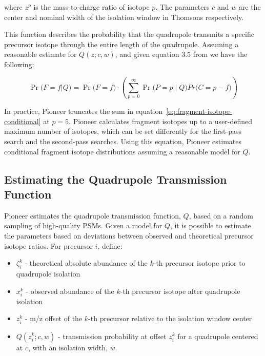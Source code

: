 \documentclass[pdflatex,sn-nature]{sn-jnl}
\begin{document}
where $z^{p}$ is the mass-to-charge ratio of isotope $p$. The parameters $c$ and $w$ are the center and nominal width of the isolation window in Thomsons respectively. 

This function describes the probability that the quadrupole transmits a specific precursor isotope through the entire length of the quadrupole. Assuming a reasonable estimate for $Q(z; c, w)$, and given equation 3.5 from \cite{Goldfarb2018-ai} we have the following: 

\begin{equation}
    \Pr\bigl( F=f | Q) =\Pr\bigl(F = f\bigr) \cdot \left(\sum\limits_{p = 0}^{\infty} \Pr\bigl( P=p \mid Q)Pr\bigl(C = p - f\bigr) \right)
\end{equation}\label{eq:fragment-isotope-conditional}

In practice, Pioneer truncates the sum in equation~\eqref{eq:fragment-isotope-conditional} at $p=5$. Pioneer calculates fragment isotopes up to a user-defined maximum number of isotopes, which can be set differently for the first-pass search and the second-pass searches. Using this equation, Pioneer estimates conditional fragment isotope distributions assuming a reasonable model for $Q$.



\subsection{Estimating the Quadrupole Transmission Function}\label{subsec:estimating-quadrupole-transmission}
Pioneer estimates the quadrupole transmission function, $Q$, based on a random sampling of high-quality PSMs. Given a model for $Q$, it is possible to estimate the parameters based on deviations between observed and theoretical precursor isotope ratios. For precursor $i$, define:

\begin{itemize}
    \item $\zeta_{i}^{k}$ - theoretical absolute abundance of the $k$-th precursor isotope prior to quadrupole isolation
    \item $x_{i}^{k}$ - observed abundance of the $k$-th precursor isotope after quadrupole isolation
    \item $z_{i}^{k}$ - m/z offset of the $k$-th precursor relative to the isolation window center
    \item $Q(z_{i}^{k}; c, w)$ - transmission probability at offset $z_i^{k}$ for a quadrupole centered at $c$, with an isolation width, $w$.    
\end{itemize}
\end{document}
